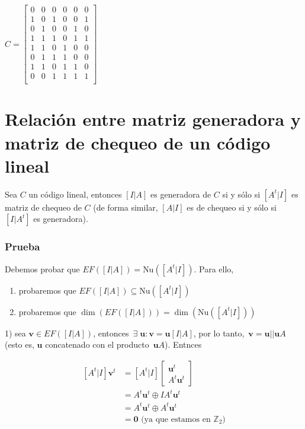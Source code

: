 \documentclass[10pt,a4paper]{article}
\begin{document}
\begin{center}
$C = \left[ \begin{array}{rccccl} 0&0&0&0&0&0\\ 1&0&1&0&0&1\\ 0&1&0&0&1&0\\ 1&1&1&0&1&1\\ 1&1&0&1&0&0\\ 0&1&1&1&0&0\\ 1&1&0&1&1&0\\ 0&0&1&1&1&1\\ \end{array} \right]$
\end{center}

\section*{Relación entre matriz generadora y matriz de chequeo de un código lineal}

Sea $C$ un código lineal, entonces $\left[I\lvert A\right]$ es generadora de $C$ si y sólo si $\left[A^t \lvert I\right]$ es matriz de chequeo de $C$ (de forma similar, $\left[A\lvert I\right]$ es de chequeo si y sólo si $\left[I\lvert A^t\right]$ es generadora).

\subsubsection*{Prueba}

Debemos probar que $EF(\left[I|A\right]) = \text{Nu}(\left[A^t|I\right])$. Para ello,

\begin{enumerate}

	\item probaremos que $EF(\left[I|A\right]) \subseteq \text{Nu}(\left[A^t|I\right])$
	\item probaremos que $\dim(EF(\left[I|A\right]) )= \dim(\text{Nu}(\left[A^t|I\right]))$
\end{enumerate}

1) sea $\textbf{v}\in EF(\left[I|A\right])$, entonces $\exists\;\textbf{u}:\textbf{v} = \textbf{u}\left[I|A\right]$, por lo tanto, $\textbf{v} = \textbf{u}||\textbf{u}A$ (esto es, $\textbf{u}$ concatenado con el producto $\textbf{u}A$). Entnces

\begin{center}
\begin{align*} \left[A^t|I\right] \textbf{v}^t &= \left[A^t |I\right]\left[\begin{array}{c}\textbf{u}^t\\A^t\textbf{u}^t\end{array}\right]\\ &=A^t\textbf{u}^t\oplus IA^t\textbf{u}^t\\ &= A^t\textbf{u}^t \oplus A^t\textbf{u}^t\\ &= \textbf{0} \text{ (ya que estamos en } \mathbb{Z}_2 \text{)} \end{align*}
\end{center}
\end{document}
